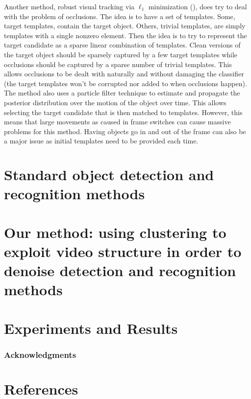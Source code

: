 \documentclass{article}
\begin{document}
Another method, robust visual tracking via $\ell_1$ minimization (\cite{L1}), does try to deal with the problem of occlusions. The idea is to have a set of templates. Some, target templates, contain the target
object. Others, trivial templates, are simply templates with a single nonzero element. Then the idea is to try to represent the target candidate as a sparse linear combination of templates. Clean versions of the 
target object should be sparsely captured by a few target templates while occlusions should be captured by a sparse number of trivial templates. This allows occlusions to be dealt with naturally and without
damaging the classifier (the target templates won't be corrupted nor added to when occlusions happen). The method also uses a particle filter technique to estimate and propagate the posterior distribution
over the motion of the object over time. This allows selecting the target candidate that is then matched to templates. However, this means that large movements as caused in frame switches can cause massive
problems for this method. Having objects go in and out of the frame can also be a major issue as initial templates need to be provided each time.


\cite{miltrack} %
\cite{TLD} %


\section{Standard object detection and recognition methods}


\section{Our method: using clustering to exploit video structure in order to denoise detection and recognition methods}


\section{Experiments and Results}

\subsubsection*{Acknowledgments}

\section*{References}



\end{document}
